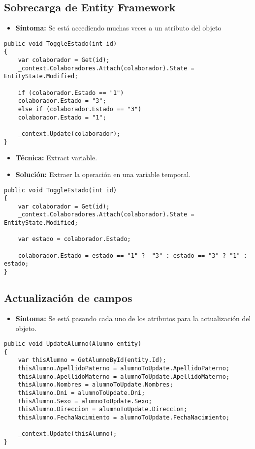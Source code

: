 
\subsection{Sobrecarga de Entity Framework}
\begin{itemize}
	\item \textbf{Síntoma:} Se está accediendo muchas veces a un atributo del objeto
\end{itemize}

\begin{lstlisting}[language={[Sharp]C}]
public void ToggleEstado(int id)
{
	var colaborador = Get(id);
	_context.Colaboradores.Attach(colaborador).State = EntityState.Modified;
	
	if (colaborador.Estado == "1")
	colaborador.Estado = "3";
	else if (colaborador.Estado == "3")
	colaborador.Estado = "1";
	
	_context.Update(colaborador);
}
\end{lstlisting}

\begin{itemize}	
	\item \textbf{Técnica:} Extract variable.
	\item \textbf{Solución:} Extraer la operación en una variable temporal.
\end{itemize}

\begin{lstlisting}[language={[Sharp]C}]
public void ToggleEstado(int id)
{
	var colaborador = Get(id);
	_context.Colaboradores.Attach(colaborador).State = EntityState.Modified;
	
	var estado = colaborador.Estado;
	
	colaborador.Estado = estado == "1" ?  "3" : estado == "3" ? "1" : estado;
}
\end{lstlisting}


\subsection{Actualización de campos}
\begin{itemize}
	\item \textbf{Síntoma:} Se está pasando cada uno de los atributos para la actualización del objeto.
\end{itemize}

\begin{lstlisting}[language={[Sharp]C}]
public void UpdateAlumno(Alumno entity)
{
	var thisAlumno = GetAlumnoById(entity.Id);
	thisAlumno.ApellidoPaterno = alumnoToUpdate.ApellidoPaterno;
	thisAlumno.ApellidoMaterno = alumnoToUpdate.ApellidoMaterno;
	thisAlumno.Nombres = alumnoToUpdate.Nombres;
	thisAlumno.Dni = alumnoToUpdate.Dni;
	thisAlumno.Sexo = alumnoToUpdate.Sexo;
	thisAlumno.Direccion = alumnoToUpdate.Direccion;
	thisAlumno.FechaNacimiento = alumnoToUpdate.FechaNacimiento;
	
	_context.Update(thisAlumno);
}
\end{lstlisting}

